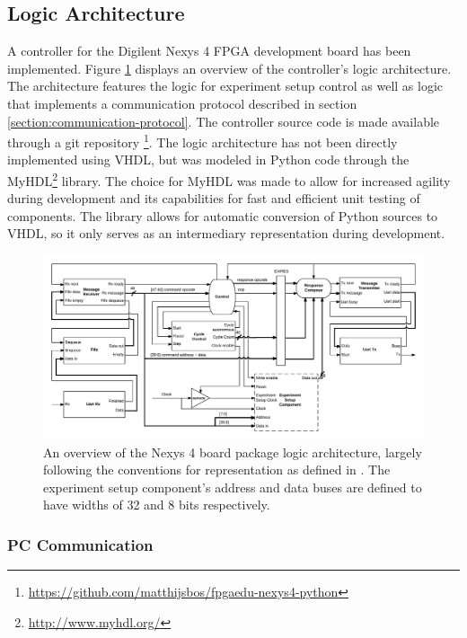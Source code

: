 \documentclass[main.tex]{subfiles}
\begin{document}
\subsection{Logic Architecture}
A controller for the Digilent Nexys 4 FPGA development board has been implemented. Figure \ref{fig:board-package-architecture} displays an overview of the controller's logic architecture. The architecture features the logic for experiment setup control as well as logic that implements a communication protocol described in section \ref{section:communication-protocol}. The controller source code is made available through a git repository \footnote{\url{https://github.com/matthijsbos/fpgaedu-nexys4-python}}. The logic architecture has not been directly implemented using VHDL, but was modeled in Python code through the MyHDL\footnote{\url{http://www.myhdl.org/}} library. The choice for MyHDL was made to allow for increased agility during development and its capabilities for fast and efficient unit testing of components. The library allows for automatic conversion of Python sources to VHDL, so it only serves as an intermediary representation during development.

\begin{figure}[h]
\centering
\caption{An overview of the Nexys 4 board package logic architecture, largely following the conventions for representation as defined in \cite[Ch.4]{hennessy2013computer}. The experiment setup component's address and data buses are defined to have widths of 32 and 8 bits respectively.}
\label{fig:board-package-architecture}
\includegraphics[width=\textwidth]{img/controller-architecture}
\end{figure}

\subsubsection{PC Communication}
\end{document}

